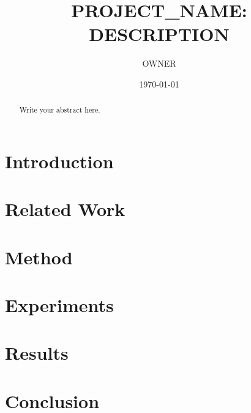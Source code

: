 \documentclass{article}
\title{{{PROJECT_NAME}}: {{DESCRIPTION}}}
\author{{{OWNER}}}
\date{\today}
\begin{document}
\maketitle

\begin{abstract}
Write your abstract here.
\end{abstract}

\section{Introduction}
\label{sec:intro}

\section{Related Work}
\label{sec:related}

\section{Method}
\label{sec:method}

\section{Experiments}
\label{sec:experiments}

\section{Results}
\label{sec:results}

\section{Conclusion}
\label{sec:conclusion}



\end{document}
